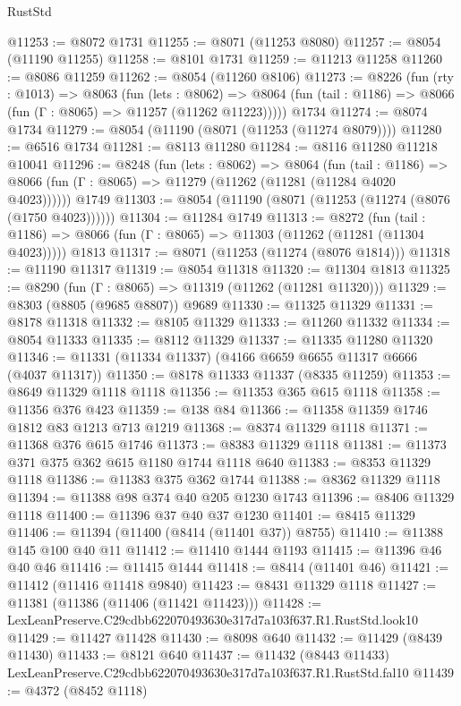 \begin{lexlean}{RustStd}
\begin{coremodule}
@11253 := @8072 @1731
@11255 := @8071 (@11253 @8080)
@11257 := @8054 (@11190 @11255)
@11258 := @8101 @1731
@11259 := @11213 @11258
@11260 := @8086 @11259
@11262 := @8054 (@11260 @8106)
@11273 := @8226
    (fun (rty : @1013) =>
    @8063
      (fun (lets : @8062) =>
      @8064 (fun (tail : @1186) => @8066 (fun (Γ : @8065) => @11257 (@11262 @11223)))))
    @1734
@11274 := @8074 @1734
@11279 := @8054 (@11190 (@8071 (@11253 (@11274 @8079))))
@11280 := @6516 @1734
@11281 := @8113 @11280
@11284 := @8116 @11280 @11218 @10041
@11296 := @8248
    (fun (lets : @8062) =>
    @8064
      (fun (tail : @1186) =>
      @8066 (fun (Γ : @8065) => @11279 (@11262 (@11281 (@11284 @4020 @4023))))))
    @1749
@11303 := @8054 (@11190 (@8071 (@11253 (@11274 (@8076 (@1750 @4023))))))
@11304 := @11284 @1749
@11313 := @8272
    (fun (tail : @1186) => @8066 (fun (Γ : @8065) => @11303 (@11262 (@11281 (@11304 @4023)))))
    @1813
@11317 := @8071 (@11253 (@11274 (@8076 @1814)))
@11318 := @11190 @11317
@11319 := @8054 @11318
@11320 := @11304 @1813
@11325 := @8290 (fun (Γ : @8065) => @11319 (@11262 (@11281 @11320)))
@11329 := @8303 (@8805 (@9685 @8807)) @9689
@11330 := @11325 @11329
@11331 := @8178 @11318
@11332 := @8105 @11329
@11333 := @11260 @11332
@11334 := @8054 @11333
@11335 := @8112 @11329
@11337 := @11335 @11280 @11320
@11346 := @11331 (@11334 @11337) (@4166 @6659 @6655 @11317 @6666 (@4037 @11317))
@11350 := @8178 @11333 @11337 (@8335 @11259)
@11353 := @8649 @11329 @1118 @1118
@11356 := @11353 @365 @615 @1118
@11358 := @11356 @376 @423
@11359 := @138 @84
@11366 := @11358 @11359 @1746 @1812 @83 @1213 @713 @1219
@11368 := @8374 @11329 @1118
@11371 := @11368 @376 @615 @1746
@11373 := @8383 @11329 @1118
@11381 := @11373 @371 @375 @362 @615 @1180 @1744 @1118 @640
@11383 := @8353 @11329 @1118
@11386 := @11383 @375 @362 @1744
@11388 := @8362 @11329 @1118
@11394 := @11388 @98 @374 @40 @205 @1230 @1743
@11396 := @8406 @11329 @1118
@11400 := @11396 @37 @40 @37 @1230
@11401 := @8415 @11329
@11406 := @11394 (@11400 (@8414 (@11401 @37)) @8755)
@11410 := @11388 @145 @100 @40 @11
@11412 := @11410 @1444 @1193
@11415 := @11396 @46 @40 @46
@11416 := @11415 @1444
@11418 := @8414 (@11401 @46)
@11421 := @11412 (@11416 @11418 @9840)
@11423 := @8431 @11329 @1118
@11427 := @11381 (@11386 (@11406 (@11421 @11423)))
@11428 := LexLeanPreserve.C29cdbb622070493630e317d7a103f637.R1.RustStd.look10
@11429 := @11427 @11428
@11430 := @8098 @640
@11432 := @11429 (@8439 @11430)
@11433 := @8121 @640
@11437 := @11432 (@8443 @11433) LexLeanPreserve.C29cdbb622070493630e317d7a103f637.R1.RustStd.fal10
@11439 := @4372 (@8452 @1118)

\end{coremodule}
\end{lexlean}
